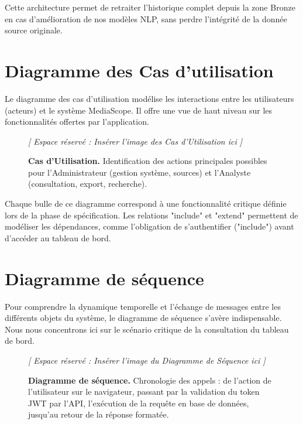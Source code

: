 \documentclass[12pt,a4paper,oneside]{report}
\begin{document}
Cette architecture permet de retraiter l'historique complet depuis la zone Bronze en cas d'amélioration de nos modèles NLP, sans perdre l'intégrité de la donnée source originale.

\section{Diagramme des Cas d'utilisation}
Le diagramme des cas d'utilisation modélise les interactions entre les utilisateurs (acteurs) et le système MediaScope. Il offre une vue de haut niveau sur les fonctionnalités offertes par l'application.

\begin{figure}[H]
    \centering
    \begin{figbox}
        \vspace{6cm}
        \textcolor{textgray}{\Large \textit{[ Espace réservé : Insérer l'image des Cas d'Utilisation ici ]}}
        \vspace{6cm}
    \end{figbox}
    \caption{\textbf{Cas d'Utilisation.} Identification des actions principales possibles pour l'Administrateur (gestion système, sources) et l'Analyste (consultation, export, recherche).}
    \label{fig:usecase}
\end{figure}

Chaque bulle de ce diagramme correspond à une fonctionnalité critique définie lors de la phase de spécification. Les relations "include" et "extend" permettent de modéliser les dépendances, comme l'obligation de s'authentifier ("include") avant d'accéder au tableau de bord.

\section{Diagramme de séquence}
Pour comprendre la dynamique temporelle et l'échange de messages entre les différents objets du système, le diagramme de séquence s'avère indispensable. Nous nous concentrons ici sur le scénario critique de la consultation du tableau de bord.

\begin{figure}[H]
    \centering
    \begin{figbox}
        \vspace{6cm}
        \textcolor{textgray}{\Large \textit{[ Espace réservé : Insérer l'image du Diagramme de Séquence ici ]}}
        \vspace{6cm}
    \end{figbox}
    \caption{\textbf{Diagramme de séquence.} Chronologie des appels : de l'action de l'utilisateur sur le navigateur, passant par la validation du token JWT par l'API, l'exécution de la requête en base de données, jusqu'au retour de la réponse formatée.}
    \label{fig:sequence}
\end{figure}
\end{document}
